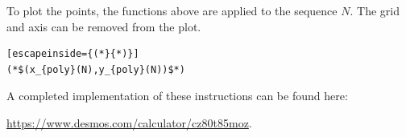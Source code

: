 \documentclass[notitlepage]{report}
\begin{document}
To plot the points, the functions above are applied to the sequence $N$. The grid and axis can be removed from the plot.

\begin{lstlisting}[escapeinside={(*}{*)}]
(*$(x_{poly}(N),y_{poly}(N))$*)
\end{lstlisting}

A completed implementation of these instructions can be found here: 

\noindent
\url{https://www.desmos.com/calculator/cz80t85moz}.



\end{document}
